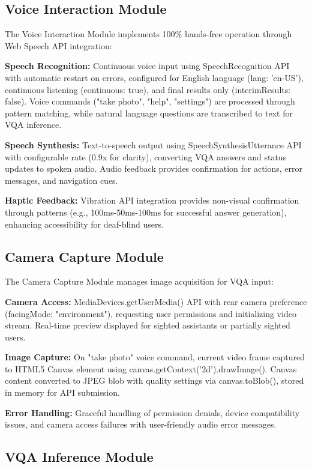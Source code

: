 \documentclass[conference]{IEEEtran}
\begin{document}
\subsection{Voice Interaction Module}

The Voice Interaction Module implements 100\% hands-free operation through Web Speech API integration:

\textbf{Speech Recognition:} Continuous voice input using SpeechRecognition API with automatic restart on errors, configured for English language (lang: 'en-US'), continuous listening (continuous: true), and final results only (interimResults: false). Voice commands ("take photo", "help", "settings") are processed through pattern matching, while natural language questions are transcribed to text for VQA inference.

\textbf{Speech Synthesis:} Text-to-speech output using SpeechSynthesisUtterance API with configurable rate (0.9x for clarity), converting VQA answers and status updates to spoken audio. Audio feedback provides confirmation for actions, error messages, and navigation cues.

\textbf{Haptic Feedback:} Vibration API integration provides non-visual confirmation through patterns (e.g., 100ms-50ms-100ms for successful answer generation), enhancing accessibility for deaf-blind users.

\subsection{Camera Capture Module}

The Camera Capture Module manages image acquisition for VQA input:

\textbf{Camera Access:} MediaDevices.getUserMedia() API with rear camera preference (facingMode: "environment"), requesting user permissions and initializing video stream. Real-time preview displayed for sighted assistants or partially sighted users.

\textbf{Image Capture:} On "take photo" voice command, current video frame captured to HTML5 Canvas element using canvas.getContext('2d').drawImage(). Canvas content converted to JPEG blob with quality settings via canvas.toBlob(), stored in memory for API submission.

\textbf{Error Handling:} Graceful handling of permission denials, device compatibility issues, and camera access failures with user-friendly audio error messages.

\subsection{VQA Inference Module}
\end{document}
